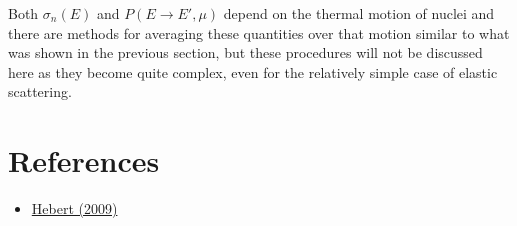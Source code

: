 \documentclass[11pt]{article}
\begin{document}
Both \(\sigma_n(E)\) and \(P(E \rightarrow E', \mu)\) depend on the thermal motion of nuclei and there are methods for averaging these quantities over that motion similar to what was shown in the previous section, but these procedures will not be discussed here as they become quite complex, even for the relatively simple case of elastic scattering.
\section{References}
\label{sec:orgheadline11}
\begin{itemize}
\item \href{Hebert2009}{Hebert (2009)}
\end{itemize}
\end{document}
